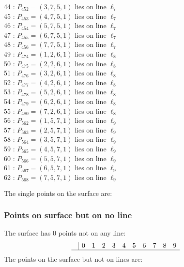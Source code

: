 \documentclass{article}
\begin{document}
{\begin{multicols}{2}
44 : $P_{452}=( 3, 7, 5, 1 )$ lies on line $\ell_{7}$\\
45 : $P_{453}=( 4, 7, 5, 1 )$ lies on line $\ell_{7}$\\
46 : $P_{454}=( 5, 7, 5, 1 )$ lies on line $\ell_{7}$\\
47 : $P_{455}=( 6, 7, 5, 1 )$ lies on line $\ell_{7}$\\
48 : $P_{456}=( 7, 7, 5, 1 )$ lies on line $\ell_{7}$\\
49 : $P_{474}=( 1, 2, 6, 1 )$ lies on line $\ell_{8}$\\
50 : $P_{475}=( 2, 2, 6, 1 )$ lies on line $\ell_{8}$\\
51 : $P_{476}=( 3, 2, 6, 1 )$ lies on line $\ell_{8}$\\
52 : $P_{477}=( 4, 2, 6, 1 )$ lies on line $\ell_{8}$\\
53 : $P_{478}=( 5, 2, 6, 1 )$ lies on line $\ell_{8}$\\
54 : $P_{479}=( 6, 2, 6, 1 )$ lies on line $\ell_{8}$\\
55 : $P_{480}=( 7, 2, 6, 1 )$ lies on line $\ell_{8}$\\
56 : $P_{562}=( 1, 5, 7, 1 )$ lies on line $\ell_{9}$\\
57 : $P_{563}=( 2, 5, 7, 1 )$ lies on line $\ell_{9}$\\
58 : $P_{564}=( 3, 5, 7, 1 )$ lies on line $\ell_{9}$\\
59 : $P_{565}=( 4, 5, 7, 1 )$ lies on line $\ell_{9}$\\
60 : $P_{566}=( 5, 5, 7, 1 )$ lies on line $\ell_{9}$\\
61 : $P_{567}=( 6, 5, 7, 1 )$ lies on line $\ell_{9}$\\
62 : $P_{568}=( 7, 5, 7, 1 )$ lies on line $\ell_{9}$\\
\end{multicols}
The single points on the surface are:\\
\subsubsection*{Points on surface but on no line}
The surface has 0 points not on any line:\\
$$
\begin{array}{r|*{10}{r}}
 & 0 & 1 & 2 & 3 & 4 & 5 & 6 & 7 & 8 & 9\\
\hline
\end{array}
$$
The points on the surface but not on lines are:\\
\begin{multicols}{2}
\noindent
\end{multicols}
}
\end{document}
